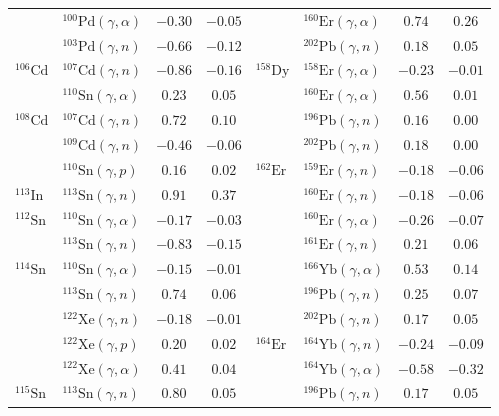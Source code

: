 \begin{table}
\begin{tabular}{llcc|llcc}
    $ $ & $^{100}\mathrm{Pd}(\gamma,\alpha)$ & $-0.30$ & $-0.05$ & $ $ & $^{160}\mathrm{Er}(\gamma,\alpha)$ & $0.74$ & $0.26$ \\ 
    $ $ & $^{103}\mathrm{Pd}(\gamma,n)$ & $-0.66$ & $-0.12$ & $ $ & $^{202}\mathrm{Pb}(\gamma,n)$ & $0.18$ & $0.05$ \\ 
    $^{106}\mathrm{Cd}$ & $^{107}\mathrm{Cd}(\gamma,n)$ & $-0.86$ & $-0.16$ & $^{158}\mathrm{Dy}$ & $^{158}\mathrm{Er}(\gamma,\alpha)$ & $-0.23$ & $-0.01$ \\ 
    $ $ & $^{110}\mathrm{Sn}(\gamma,\alpha)$ & $0.23$ & $0.05$ & $ $ & $^{160}\mathrm{Er}(\gamma,\alpha)$ & $0.56$ & $0.01$ \\ 
    $^{108}\mathrm{Cd}$ & $^{107}\mathrm{Cd}(\gamma,n)$ & $0.72$ & $0.10$ & $ $ & $^{196}\mathrm{Pb}(\gamma,n)$ & $0.16$ & $0.00$ \\ 
    $ $ & $^{109}\mathrm{Cd}(\gamma,n)$ & $-0.46$ & $-0.06$ & $ $ & $^{202}\mathrm{Pb}(\gamma,n)$ & $0.18$ & $0.00$ \\ 
    $ $ & $^{110}\mathrm{Sn}(\gamma,p)$ & $0.16$ & $0.02$ & $^{162}\mathrm{Er}$ & $^{159}\mathrm{Er}(\gamma,n)$ & $-0.18$ & $-0.06$ \\ 
    $^{113}\mathrm{In}$ & $^{113}\mathrm{Sn}(\gamma,n)$ & $0.91$ & $0.37$ & $ $ & $^{160}\mathrm{Er}(\gamma,n)$ & $-0.18$ & $-0.06$ \\ 
    $^{112}\mathrm{Sn}$ & $^{110}\mathrm{Sn}(\gamma,\alpha)$ & $-0.17$ & $-0.03$ & $ $ & $^{160}\mathrm{Er}(\gamma,\alpha)$ & $-0.26$ & $-0.07$ \\ 
    $ $ & $^{113}\mathrm{Sn}(\gamma,n)$ & $-0.83$ & $-0.15$ & $ $ & $^{161}\mathrm{Er}(\gamma,n)$ & $0.21$ & $0.06$ \\ 
    $^{114}\mathrm{Sn}$ & $^{110}\mathrm{Sn}(\gamma,\alpha)$ & $-0.15$ & $-0.01$ & $ $ & $^{166}\mathrm{Yb}(\gamma,\alpha)$ & $0.53$ & $0.14$ \\ 
    $ $ & $^{113}\mathrm{Sn}(\gamma,n)$ & $0.74$ & $0.06$ & $ $ & $^{196}\mathrm{Pb}(\gamma,n)$ & $0.25$ & $0.07$ \\ 
    $ $ & $^{122}\mathrm{Xe}(\gamma,n)$ & $-0.18$ & $-0.01$ & $ $ & $^{202}\mathrm{Pb}(\gamma,n)$ & $0.17$ & $0.05$ \\ 
    $ $ & $^{122}\mathrm{Xe}(\gamma,p)$ & $0.20$ & $0.02$ & $^{164}\mathrm{Er}$ & $^{164}\mathrm{Yb}(\gamma,n)$ & $-0.24$ & $-0.09$ \\ 
    $ $ & $^{122}\mathrm{Xe}(\gamma,\alpha)$ & $0.41$ & $0.04$ & $ $ & $^{164}\mathrm{Yb}(\gamma,\alpha)$ & $-0.58$ & $-0.32$ \\ 
    $^{115}\mathrm{Sn}$ & $^{113}\mathrm{Sn}(\gamma,n)$ & $0.80$ & $0.05$ & $ $ & $^{196}\mathrm{Pb}(\gamma,n)$ & $0.17$ & $0.05$ \\ 

\end{tabular}
\end{table}
